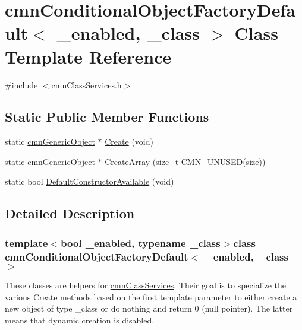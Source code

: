 \hypertarget{classcmn_conditional_object_factory_default}{}\section{cmn\+Conditional\+Object\+Factory\+Default$<$ \+\_\+enabled, \+\_\+class $>$ Class Template Reference}
\label{classcmn_conditional_object_factory_default}


{\ttfamily \#include $<$cmn\+Class\+Services.\+h$>$}

\subsection*{Static Public Member Functions}
\begin{DoxyCompactItemize}
\item 
static \hyperlink{classcmn_generic_object}{cmn\+Generic\+Object} $\ast$ \hyperlink{classcmn_conditional_object_factory_default_ad0da5547777e23f77fb6a983ef003b2a}{Create} (void)
\item 
static \hyperlink{classcmn_generic_object}{cmn\+Generic\+Object} $\ast$ \hyperlink{classcmn_conditional_object_factory_default_aa67042b33210826aa74c16d986890980}{Create\+Array} (size\+\_\+t \hyperlink{cmn_portability_8h_a021894e2626935fa2305434b1e893ff6}{C\+M\+N\+\_\+\+U\+N\+U\+S\+E\+D}(size))
\item 
static bool \hyperlink{classcmn_conditional_object_factory_default_a4a93d590358aa5fb80a11209ed2e24d3}{Default\+Constructor\+Available} (void)
\end{DoxyCompactItemize}


\subsection{Detailed Description}
\subsubsection*{template$<$bool \+\_\+enabled, typename \+\_\+class$>$class cmn\+Conditional\+Object\+Factory\+Default$<$ \+\_\+enabled, \+\_\+class $>$}

These classes are helpers for \hyperlink{classcmn_class_services}{cmn\+Class\+Services}. Their goal is to specialize the various Create methods based on the first template parameter to either create a new object of type \+\_\+class or do nothing and return 0 (null pointer). The latter means that dynamic creation is disabled.

